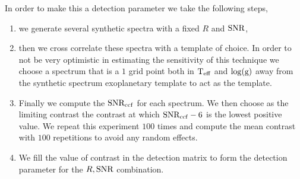 In order to make this a detection parameter we take the following steps,
\begin{enumerate}
    \item we generate several synthetic spectra with a fixed $R$ and $\rm{SNR}$,
    \item then we cross correlate these spectra with a template of choice. In order to not be very optimistic in estimating the sensitivity of this technique we choose a spectrum that is a $1$ grid point both in $\rm{T_{eff}}$ and $\rm{\log(g)}$ away from the synthetic spectrum exoplanetary template to act as the template.
    \item Finally we compute the $\rm{SNR_{ccf}}$ for each spectrum. We then choose as the limiting contrast the contrast at which $\rm{SNR_{ccf}}-6$ is the lowest positive value.
    We repeat this experiment $100$ times and compute the mean contrast with $100$ repetitions to avoid any random effects.
    \item We fill the value of contrast in the detection matrix to form the detection parameter for the $R,\rm{SNR}$ combination.
\end{enumerate}

